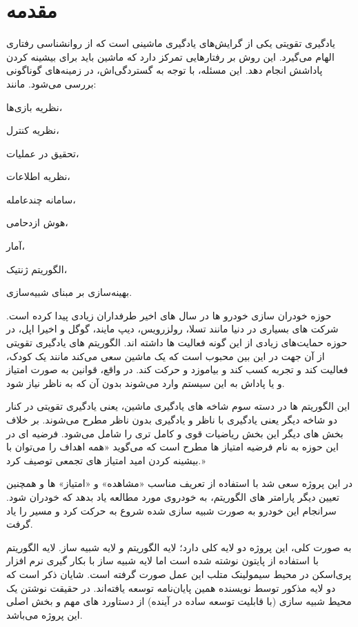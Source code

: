 \chapter{مقدمه}

یادگیری تقویتی یکی از گرایش‌های یادگیری ماشینی است که از روانشناسی رفتاری الهام می‌گیرد. این روش بر رفتارهایی تمرکز دارد که ماشین باید برای بیشینه کردن پاداشش انجام دهد. این مسئله، با توجه به گستردگی‌اش، در زمینه‌های گوناگونی بررسی می‌شود. مانند: 
\begin{alphinline}
	\item
	نظریه بازی‌ها،
	\item  
	نظریه کنترل، 
	\item 
	تحقیق در عملیات،
	 \item 
	نظریه اطلاعات، 
	\item 
	سامانه چندعامله، 
	\item 
	هوش ازدحامی، 
	\item 
	آمار، 
	\item 
	الگوریتم ژنتیک، 
	\item
	بهینه‌سازی بر مبنای شبیه‌سازی. 
	
\end{alphinline}

حوزه خودران سازی خودرو ها در سال های اخیر طرفداران زیادی پیدا کرده است. شرکت های بسیاری در دنیا مانند تسلا، رولزرویس، دیپ مایند، گوگل و اخیرا اپل، در حوزه حمایت‌های زیادی از این گونه فعالیت ها داشته اند. الگوریتم های یادگیری تقویتی از آن جهت در این بین محبوب است که یک ماشین سعی می‌کند مانند یک کودک، فعالیت کند و تجربه کسب کند و بیاموزد و حرکت کند. در واقع، قوانین به صورت امتیاز و یا پاداش به این سیستم وارد می‌شوند بدون آن که به ناظر نیاز شود.

این الگوریتم ها در دسته سوم شاخه های یادگیری ماشین، یعنی یادگیری تقویتی در کنار دو شاخه دیگر یعنی یادگیری با ناظر و یادگیری بدون ناظر مطرح می‌شوند. بر خلاف بخش های دیگر این بخش ریاضیات قوی و کامل تری را شامل می‌شود. فرضیه ای در این حوزه به نام فرضیه امتیاز ها مطرح است که می‌گوید «همه اهداف را می‌توان با بیشینه کردن امید امتیاز های تجمعی توصیف کرد.»

در این پروژه سعی شد با استفاده از تعریف مناسب «مشاهده» و «امتیاز» ها و همچنین تعیین دیگر پارامتر های الگوریتم، به خودروی مورد مطالعه یاد بدهد که خودران شود. سرانجام این خودرو به صورت شبیه سازی شده شروع به حرکت کرد و مسیر را یاد گرفت.

به صورت کلی، این پروژه دو لایه کلی دارد؛ لایه الگوریتم و لایه شبیه ساز. 
لایه الگوریتم با استفاده از پایتون نوشته شده است اما لایه شبیه ساز با بکار گیری نرم افزار پری‌اسکن در محیط سیمولینک متلب این عمل صورت گرفته است. شایان ذکر است که دو لایه مذکور توسط نویسنده همین پایان‌نامه توسعه یافته‌اند. در حقیقت نوشتن یک محیط شبیه سازی (با قابلیت توسعه ساده در آینده)
از دستاورد های مهم و بخش اصلی این پروژه می‌باشد.


